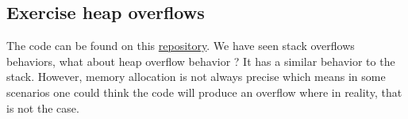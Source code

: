 \documentclass[a4paper, 11pt]{article}
\newcommand{\xmark}{\ding{55}}
\begin{document}
\subsection{Exercise heap overflows}
	The code can be found on this \href{https://ctsrd-cheri.github.io/cheri-exercises/exercises/buffer-overflow-heap}{repository}.
	We have seen stack overflows behaviors, what about heap overflow behavior ?
	It has a similar behavior to the stack. However, memory allocation is not always precise which means in some scenarios one could think the code will produce an overflow where in reality, that is not the case.
	
\begin{center}
\end{center}
\end{document}
